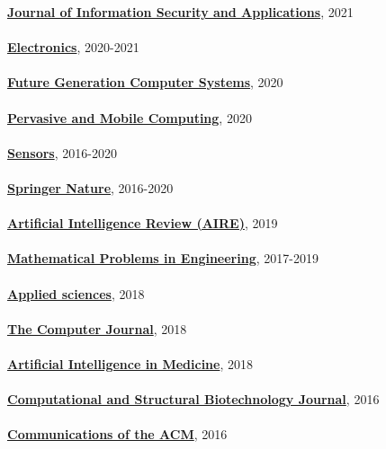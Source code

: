 \href{https://www.journals.elsevier.com/journal-of-information-security-and-applications}{\textbf{Journal of Information Security and Applications}}, 2021
\\ \halfblankline \\
\href{https://www.mdpi.com/journal/electronics}{\textbf{Electronics}}, 2020-2021
\\ \halfblankline \\
\href{https://www.sciencedirect.com/journal/future-generation-computer-systems}{\textbf{Future Generation Computer Systems}}, 2020
\\ \halfblankline \\
\href{https://www.journals.elsevier.com/pervasive-and-mobile-computing}{\textbf{Pervasive and Mobile Computing}}, 2020
\\ \halfblankline \\
\href{http://www.mdpi.com/journal/sensors}{\textbf{Sensors}}, 2016-2020
\\ \halfblankline \\
\href{https://www.springernature.com/gp}{\textbf{Springer Nature}}, 2016-2020
\\ \halfblankline \\
\href{https://link.springer.com/journal/10462}{\textbf{Artificial Intelligence Review (AIRE)}}, 2019
\\ \halfblankline \\
\href{https://www.hindawi.com/journals/mpe/}{\textbf{Mathematical Problems in Engineering}}, 2017-2019
\\ \halfblankline \\
\href{http://www.mdpi.com/journal/applsci}{\textbf{Applied sciences}}, 2018
\\ \halfblankline \\
\href{https://academic.oup.com/comjnl}{\textbf{The Computer Journal}}, 2018
\\ \halfblankline \\
\href{https://www.journals.elsevier.com/artificial-intelligence-in-medicine/}{\textbf{Artificial Intelligence in Medicine}}, 2018
\\ \halfblankline \\
\href{https://www.journals.elsevier.com/computational-and-structural-biotechnology-journal/}{\textbf{Computational and Structural Biotechnology Journal}}, 2016
\\ \halfblankline \\
\href{http://cacm.acm.org/}{\textbf{Communications of the ACM}}, 2016

